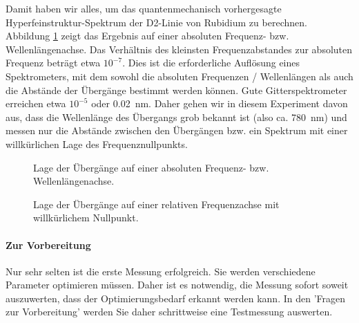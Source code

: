 Damit haben wir alles, um das quantenmechanisch vorhergesagte Hyperfeinstruktur-Spektrum der D2-Linie von Rubidium zu berechnen. Abbildung \ref{sim_spectra} zeigt das Ergebnis auf einer absoluten Frequenz- bzw. Wellenlängenachse. Das Verhältnis des kleinsten Frequenzabstandes zur absoluten Frequenz beträgt etwa $10^{-7}$. Dies ist die erforderliche Auflösung eines Spektrometers, mit dem sowohl die absoluten Frequenzen / Wellenlängen als auch die Abstände der Übergänge bestimmt werden können. Gute Gitterspektrometer erreichen etwa $10^{-5}$ oder 0.02~nm. Daher gehen wir in diesem Experiment davon aus, dass die Wellenlänge des Übergangs grob bekannt ist (also ca. 780~nm) und messen nur die Abstände zwischen den Übergängen bzw. ein Spektrum mit einer willkürlichen Lage des Frequenznullpunkts.


\begin{figure}

 \vspace*{5mm}

	\caption{Lage der Übergänge auf einer absoluten Frequenz- bzw. Wellenlängenachse.}
	\label{sim_spectra}
\end{figure}




\begin{figure}

	\caption{Lage der Übergänge auf einer relativen Frequenzachse mit willkürlichem Nullpunkt.}
	\label{sim_spectra_null}
\end{figure}


\paragraph*{Zur Vorbereitung}  Nur sehr selten ist die erste Messung erfolgreich. Sie werden verschiedene Parameter optimieren müssen. Daher ist es notwendig, die Messung sofort soweit auszuwerten, dass der Optimierungsbedarf erkannt werden kann.  In den 'Fragen zur Vorbereitung' werden Sie daher schrittweise eine Testmessung auswerten.

\begin{questions}
\end{questions}
	

